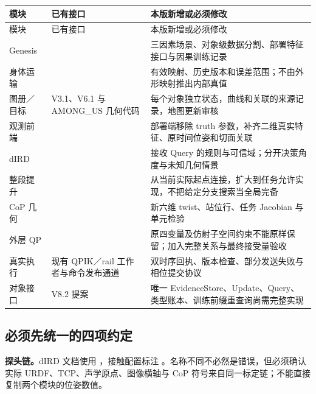 \documentclass[UTF8,11pt,a4paper,fontset=fandol]{ctexart}
\numberwithin{equation}{section}
\theoremstyle{definition}
\newcommand{\RealBase}{https://github.com/NingMeng0903/RealUS_playground/blob/6a943e3dcf8c6ea68b9f75c398eb1f4307a9b81a}
\newcommand{\AmongBase}{https://github.com/NingMeng0903/AMONG_US/blob/f1ffc5078d6a08c32b59107ab16086a7bbde488e}
\newcommand{\code}[1]{\texttt{\detokenize{#1}}}
\begin{document}
\begin{longtable}{P{26mm}P{59mm}P{63mm}}
\toprule
模块 & 已有接口 & 本版新增或必须修改\\\midrule\endfirsthead
\toprule 模块 & 已有接口 & 本版新增或必须修改\\\midrule\endhead
Genesis & \href{\RealBase/src/projects/genesis_ue_sync/sim_platform/simulation/runtime.py}{} & 三因素场景、对象级数据分割、部署特征接口与因果训练记录\\
身体运输 & \href{\RealBase/src/projects/genesis_ue_sync/anatomy_retarget/material_runtime_v13.py}{} & 有效映射、历史版本和误差范围；不由外形映射推出内部真值\\
图册／目标 & V3.1、V6.1 与 AMONG\_US 几何代码 & 每个对象独立状态，曲线和关联的来源记录，地图更新审核\\
观测前端 & \href{\AmongBase/DMP_playground/core_algorithms/observation.py}{} & 部署端移除 truth 参数，补齐二维真实特征、原时间位姿和切面关联\\
dIRD & \href{\RealBase/ird_playground/README.md}{} & 接收 Query 的规则与可信域；分开决策角度与未知几何情景\\
整段提升 & \href{\RealBase/ird_playground/ird_playground/optimization/srs_trajectory_dp.py}{} & 从当前实际起点连接，扩大到任务允许实现，不把给定分支搜索当全局完备\\
CoP 几何 & \href{\RealBase/peirastic/contact_qp/geometry.py}{} & 新六维 twist、站位行、任务 Jacobian 与单元检验\\
外层 QP & \href{\RealBase/peirastic/contact_qp/weighted_outer.py}{} & 原四变量及仿射子空间约束不能原样保留；加入完整关系与最终接受量验收\\
真实执行 & 现有 QPIK／rail 工作者与命令发布通道 & 双时序回执、版本检查、部分发送失败与相位提交协议\\
对象接口 & V8.2 提案 & 唯一 EvidenceStore、Update、Query、类型账本、训练前缀重查询尚需完整实现\\\bottomrule
\end{longtable}

\subsection{必须先统一的四项约定}
\textbf{探头链。}dIRD 文档使用 \code{probe45}，接触配置标注 \code{probe50_center_tcp}。名称不同不必然是错误，但必须确认实际 URDF、TCP、声学原点、图像横轴与 CoP 符号来自同一标定链；不能直接复制两个模块的位姿数值。
\end{document}
